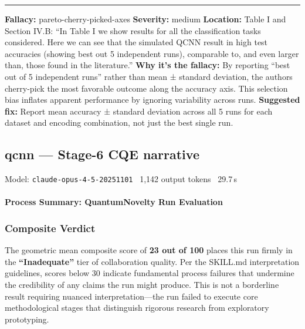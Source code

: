 \documentclass[10pt,letterpaper]{article}
\begin{document}
\begin{center}\rule{0.5\linewidth}{0.5pt}\end{center}

\textbf{Fallacy:} pareto-cherry-picked-axes
\textbf{Severity:} medium
\textbf{Location:} Table I and Section IV.B: ``In Table I we show results for all the classification tasks considered. Here we can see that the simulated QCNN result in high test accuracies (showing best out 5 independent runs), comparable to, and even larger than, those found in the literature.''
\textbf{Why it's the fallacy:} By reporting ``best out of 5 independent runs'' rather than mean ± standard deviation, the authors cherry-pick the most favorable outcome along the accuracy axis. This selection bias inflates apparent performance by ignoring variability across runs.
\textbf{Suggested fix:} Report mean accuracy ± standard deviation across all 5 runs for each dataset and encoding combination, not just the best single run.


\subsection{qcnn --- Stage-6 CQE narrative}
\noindent\textcolor{muted}{\small Model: \texttt{claude-opus-4-5-20251101} \textperiodcentered\ 1,142 output tokens \textperiodcentered\ 29.7\,s}

\hypertarget{process-summary-quantumnovelty-run-evaluation}{%
\paragraph{Process Summary: QuantumNovelty Run Evaluation}\label{process-summary-quantumnovelty-run-evaluation}}

\hypertarget{composite-verdict}{%
\subsubsection{Composite Verdict}\label{composite-verdict}}

The geometric mean composite score of \textbf{23 out of 100} places this run firmly in the \textbf{``Inadequate''} tier of collaboration quality. Per the SKILL.md interpretation guidelines, scores below 30 indicate fundamental process failures that undermine the credibility of any claims the run might produce. This is not a borderline result requiring nuanced interpretation---the run failed to execute core methodological stages that distinguish rigorous research from exploratory prototyping.
\end{document}
